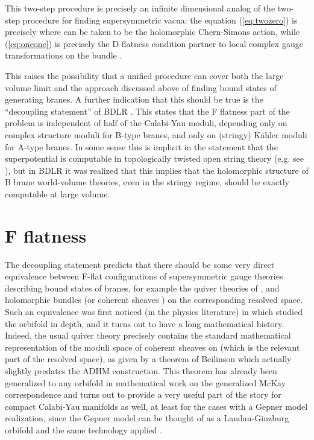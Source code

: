\documentclass[a4paper,12pt]{amsart}
\numberwithin{equation}{section}
\theoremstyle{plain}
\theoremstyle{definition}
\def\Bbb#1{{\fam\black\relax#1}}
\def\Bbb{\bf}
\def\BC{\Bbb{C}}
\def\BP{\Bbb{P}}
\def\BZ{\Bbb{Z}}
\def\p{\partial}
\begin{document}
This two-step procedure is precisely an infinite dimensional analog of
the two-step procedure for finding supersymmetric vacua: the equation
(\ref{eq:twozero}) is precisely \myHighlight{$\p W/\p \phi_i=0$}\coordHE{} where \coordHE{} can be
taken to be the holomorphic Chern-Simons action, while
(\ref{eq:oneone}) is precisely the D-flatness condition partner to
local complex gauge transformations on the bundle \coordHE{}.

This raises the possibility that a unified procedure can cover both
the large volume limit and the approach discussed above of finding
bound states of generating branes.  A further indication that this
should be true is the ``decoupling statement'' of BDLR \cite{BDLR}.
This states that the F flatness part of the problem is independent of
half of the Calabi-Yau moduli, depending only on complex structure
moduli for B-type branes, and only on (stringy) K\"ahler moduli for
A-type branes.  In some sense this is implicit in the statement that
the superpotential is computable in topologically twisted open string
theory (e.g. see \cite{Witten-top,BCOV}), but in BDLR it was realized
that this implies that the holomorphic structure of B brane
world-volume theories, even in the stringy regime, should be exactly
computable at large volume.

\section{F flatness}

The decoupling statement predicts that there should be some very
direct equivalence between F-flat configurations of supersymmetric
gauge theories describing bound states of branes, for example the
quiver theories of \cite{DGM}, and holomorphic bundles (or coherent
sheaves \cite{HarveyMoore}) on the corresponding resolved space.  Such
an equivalence was first noticed (in the physics literature) in
\cite{DFRtwo} which studied the \myHighlight{$\BC^3/\BZ_3$}\coordHE{} orbifold in depth, and
it turns out to have a long mathematical history.  Indeed, the usual
\myHighlight{$\BC^3/\BZ_3$}\coordHE{} quiver theory precisely contains the standard
mathematical representation of the moduli space of coherent sheaves on
\myHighlight{$\BC\BP^2$}\coordHE{} (which is the relevant part of the resolved space), as
given by a theorem of Beilinson \cite{Beilinson} which actually
slightly predates the ADHM construction.  This theorem has already
been generalized to any \myHighlight{$\BC^3/\Gamma$}\coordHE{} orbifold in mathematical work
on the generalized McKay correspondence \cite{Reid} and turns out to
provide a very useful part of the story for compact Calabi-Yau
manifolds as well, at least for the cases with a Gepner model
realization, since the Gepner model can be thought of as a
Landau-Ginzburg orbifold \myHighlight{$\BC^5/\Gamma$}\coordHE{} and the same technology
applied \cite{DD,GJ,Mayr,Tomas}.
\end{document}

